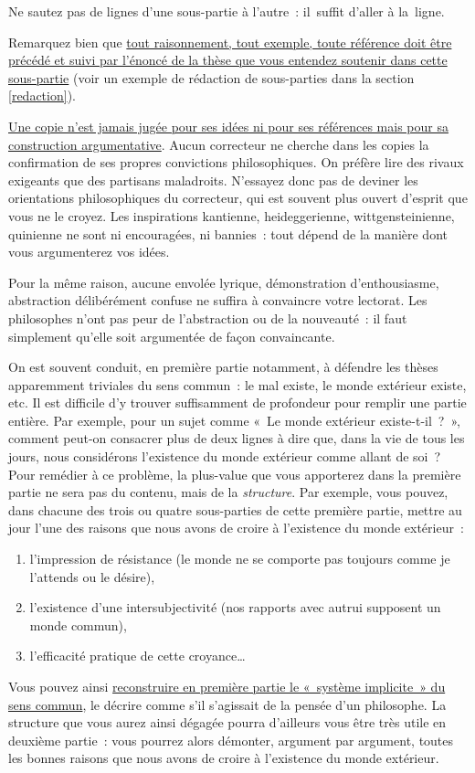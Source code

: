\documentclass[a4paper,12pt]{article}
\begin{document}
Ne sautez pas de lignes d'une sous-partie à l'autre : il suffit d'aller
à la ligne.

Remarquez bien que \uline{tout raisonnement, tout exemple, toute référence
doit être précédé et suivi par l'énoncé de la thèse que vous entendez
soutenir dans cette sous-partie} (voir un exemple de rédaction de
sous-parties dans la section \ref{redaction}).

\uline{Une copie n'est jamais jugée pour ses idées ni pour ses références mais
pour sa construction argumentative}. Aucun correcteur ne cherche dans
les copies la confirmation de ses propres convictions philosophiques. On
préfère lire des rivaux exigeants que des partisans maladroits.
N'essayez donc pas de deviner les orientations philosophiques du
correcteur, qui est souvent plus ouvert d'esprit que vous ne le croyez.
Les inspirations kantienne, heideggerienne, wittgensteinienne, quinienne
ne sont ni encouragées, ni bannies : tout dépend de la manière dont vous
argumenterez vos idées.

Pour la même raison, aucune envolée lyrique, démonstration
d'enthousiasme, abstraction délibérément confuse ne suffira à convaincre
votre lectorat. Les philosophes n'ont pas peur de l'abstraction ou de la
nouveauté : il faut simplement qu'elle soit argumentée de façon
convaincante.

On est souvent conduit, en première partie notamment, à défendre les
thèses apparemment triviales du sens commun : le mal existe, le monde
extérieur existe, etc. Il est difficile d'y trouver suffisamment de
profondeur pour remplir une partie entière. Par exemple, pour un sujet
comme « Le monde extérieur existe-t-il ? », comment peut-on consacrer
plus de deux lignes à dire que, dans la vie de tous les jours, nous
considérons l'existence du monde extérieur comme allant de soi ?
Pour remédier à ce problème, la plus-value que vous apporterez dans la
première partie ne sera pas du contenu, mais de la \emph{structure}. Par
exemple, vous pouvez, dans chacune des trois ou quatre sous-parties de
cette première partie, mettre au jour l'une des raisons que nous avons
de croire à l'existence du monde extérieur : 
\begin{enumerate}
\item l'impression de résistance (le monde ne se comporte pas toujours
comme je l'attends ou le désire),
\item l'existence d'une intersubjectivité (nos rapports avec autrui
supposent un monde commun),
\item l'efficacité pratique de cette croyance\ldots{}
\end{enumerate}
Vous pouvez ainsi \uline{reconstruire en première partie le « système
implicite » du sens commun}, le décrire comme s'il s'agissait de la
pensée d'un philosophe. La structure que vous aurez ainsi dégagée pourra
d'ailleurs vous être très utile en deuxième partie : vous pourrez alors
démonter, argument par argument, toutes les bonnes raisons que nous
avons de croire à l'existence du monde extérieur.
\end{document}
